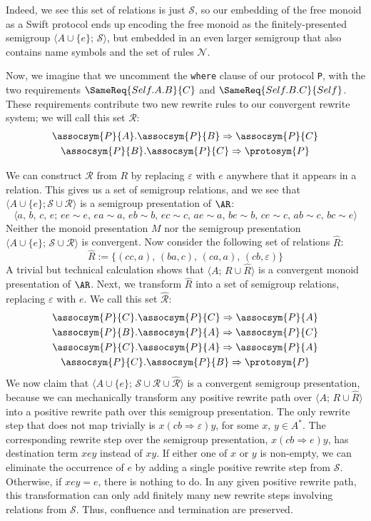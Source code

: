 \documentclass[../generics]{subfiles}
\begin{document}
\begin{example}
Indeed, we see this set of relations is just $\mathcal{S}$, so our embedding of the free monoid as a Swift protocol ends up encoding the free monoid as the finitely-presented semigroup $\langle A\cup\{e\};\,\mathcal{S}\rangle$, but embedded in an even larger semigroup that also contains name symbols and the set of rules $\mathcal{N}$.

Now, we imagine that we uncomment the \texttt{where} clause of our protocol \texttt{P}, with the two requirements $\SameReq{Self.A.B}{C}$ and $\SameReq{Self.B.C}{Self}$. These requirements contribute two new rewrite rules to our convergent rewrite system; we will call this set $\mathcal{R}$:
\begin{gather*}
\assocsym{P}{A}.\assocsym{P}{B}\Rightarrow\assocsym{P}{C}\\
\assocsym{P}{B}.\assocsym{P}{C}\Rightarrow\protosym{P}
\end{gather*}

We can construct $\mathcal{R}$ from $R$ by replacing $\varepsilon$ with $e$ anywhere that it appears in a relation. This gives us a set of semigroup relations, and we see that $\langle A\cup\{e\}; \mathcal{S}\cup\mathcal{R} \rangle$ is a semigroup presentation of $\AR$:
\[\langle a,\,b,\,c,\,e;\,ee\sim e,\,ea\sim a,\,eb\sim b,\,ec\sim c,\,ae\sim a,\,be\sim b,\,ce\sim c,\,ab\sim c,\,bc\sim e\rangle\]
Neither the monoid presentation $M$ nor the semigroup presentation $\langle A\cup\{e\};\,\mathcal{S}\cup\mathcal{R}\rangle$ is convergent. Now consider the following set of relations $\hat{R}$:
\[\hat{R} := \{(cc,a),\,(ba,c),\,(ca,a),\,(cb,\varepsilon)\}\]
A trivial but technical calculation shows that $\langle A;\,R\cup\hat{R}\rangle$ is a convergent monoid presentation of $\AR$. Next, we transform $\hat{R}$ into a set of semigroup relations, replacing $\varepsilon$ with $e$. We call this set $\hat{\mathcal{R}}$:
\begin{gather*}
\assocsym{P}{C}.\assocsym{P}{C}\Rightarrow\assocsym{P}{A}\\
\assocsym{P}{B}.\assocsym{P}{A}\Rightarrow\assocsym{P}{C}\\
\assocsym{P}{C}.\assocsym{P}{A}\Rightarrow\assocsym{P}{A}\\
\assocsym{P}{C}.\assocsym{P}{B}\Rightarrow\protosym{P}
\end{gather*}
We now claim that $\langle A\cup\{e\};\,\mathcal{S}\cup\mathcal{R}\cup\hat{\mathcal{R}}\rangle$ is a convergent semigroup presentation, because we can mechanically transform any positive rewrite path over $\langle A;\,R\cup\hat{R}\rangle$ into a positive rewrite path over this semigroup presentation. The only rewrite step that does not map trivially is $x(cb\Rightarrow\varepsilon)y$, for some $x$, $y\in A^*$. The corresponding rewrite step over the semigroup presentation, $x(cb\Rightarrow e)y$, has destination term $xey$ instead of $xy$. If either one of $x$ or $y$ is non-empty, we can eliminate the occurrence of $e$ by adding a single positive rewrite step from $\mathcal{S}$. Otherwise, if $xey=e$, there is nothing to do. In any given positive rewrite path, this transformation can only add finitely many new rewrite steps involving relations from $\mathcal{S}$. Thus, confluence and termination are preserved.


\end{example}
\end{document}
